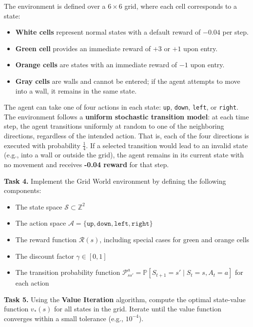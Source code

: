 \documentclass[12pt]{extreport}
\theoremstyle{definition}
\begin{document}
\noindent The environment is defined over a $6 \times 6$ grid, where each cell corresponds to a state:

\begin{itemize}
  \item \textbf{White cells} represent normal states with a default reward of $-0.04$ per step.
  \item \textbf{Green cell} provides an immediate reward of $+3$ or $+1$ upon entry.
  \item \textbf{Orange cells} are states with an immediate reward of $-1$ upon entry.
  \item \textbf{Gray cells} are walls and cannot be entered; if the agent attempts to move into a wall, it remains in the same state.
\end{itemize}

\noindent The agent can take one of four actions in each state: \texttt{up}, \texttt{down}, \texttt{left}, or \texttt{right}. The environment follows a \textbf{uniform stochastic transition model}: at each time step, the agent transitions uniformly at random to one of the neighboring directions, regardless of the intended action. That is, each of the four directions is executed with probability \( \frac{1}{4} \). If a selected transition would lead to an invalid state (e.g., into a wall or outside the grid), the agent remains in its current state with no movement and receives \textbf{-0.04 reward} for that step.




\newpage
\noindent\textbf{Task 4.} Implement the Grid World environment by defining the following components:
\begin{itemize}
  \item The state space \( \mathcal{S} \subset \mathbb{Z}^2 \)
  \item The action space \( \mathcal{A} = \{ \texttt{up}, \texttt{down}, \texttt{left}, \texttt{right} \} \)
  \item The reward function \( \mathcal{R}(s) \), including special cases for green and orange cells
  \item The discount factor \( \gamma \in [0,1] \)
  \item The transition probability function \( \mathcal{P}^a_{ss'} = \mathbb{P}[S_{t+1} = s' \mid S_t = s, A_t = a] \) for each action
\end{itemize}

\medskip

\noindent\textbf{Task 5.} Using the \textbf{Value Iteration} algorithm, compute the optimal state-value function \( v_*(s) \) for all states in the grid. Iterate until the value function converges within a small tolerance (e.g., $10^{-4}$).
\end{document}
